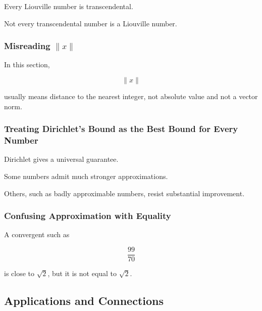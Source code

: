 Every Liouville number is transcendental.

Not every transcendental number is a Liouville number.

\subsubsection{Misreading \(\|x\|\)}

In this section,

\[ \|x\| \]

usually means distance to the nearest integer, not absolute value and not a
vector norm.

\subsubsection{Treating Dirichlet's Bound as the Best Bound for Every Number}

Dirichlet gives a universal guarantee.

Some numbers admit much stronger approximations.

Others, such as badly approximable numbers, resist substantial improvement.

\subsubsection{Confusing Approximation with Equality}

A convergent such as

\[ \frac{99}{70} \]

is close to \(\sqrt2\), but it is not equal to \(\sqrt2\).

\subsection{Applications and Connections}
\label{subsec:diophantine-approximation-applications}

